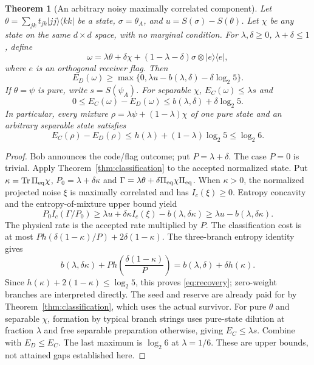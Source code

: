 \documentclass[11pt]{article}
\newtheorem{theorem}{Theorem}
\newcommand{\Tr}{\operatorname{Tr}}
\begin{document}
\begin{theorem}[An arbitrary noisy maximally correlated component]\label{thm:recovery}
Let $\theta=\sum_{jk}t_{jk}|jj\rangle\langle kk|$ be a state,
$\sigma=\theta_A$, and $u=S(\sigma)-S(\theta)$. Let $\chi$ be any
state on the same $d\times d$ space, with no marginal condition.
For $\lambda,\delta\ge0$, $\lambda+\delta\le1$, define
\[
 \omega=\lambda\theta+\delta\chi+
   (1-\lambda-\delta)\sigma\otimes|e\rangle\langle e|,
\]
where $e$ is an orthogonal receiver flag. Then
\begin{equation}\label{eq:recovery}
 E_D(\omega)\ge\max\{0,\lambda u-b(\lambda,\delta)-\delta\log_2 5\}.
\end{equation}
If $\theta=\psi$ is pure, write $s=S(\psi_A)$. For separable $\chi$,
$E_C(\omega)\le\lambda s$ and
\begin{equation}\label{eq:irreversible}
 0\le E_C(\omega)-E_D(\omega)\le b(\lambda,\delta)+\delta\log_2 5.
\end{equation}
In particular, every mixture $\rho=\lambda\psi+(1-\lambda)\chi$ of
one pure state and an arbitrary separable state satisfies
\begin{equation}\label{eq:log6}
 E_C(\rho)-E_D(\rho)\le h(\lambda)+(1-\lambda)\log_2 5\le\log_2 6.
\end{equation}
\end{theorem}
\begin{proof}
Bob announces the code/flag outcome; put $P=\lambda+\delta$.
The case $P=0$ is trivial. Apply Theorem~\ref{thm:classification}
to the accepted normalized state. Put
$\kappa=\Tr\Pi_{\rm eq}\chi$, $P_0=\lambda+\delta\kappa$ and
$\Gamma=\lambda\theta+\delta\Pi_{\rm eq}\chi\Pi_{\rm eq}$.
When $\kappa>0$, the normalized projected noise $\xi$ is maximally
correlated and has $I_c(\xi)\ge0$. Entropy concavity and the
entropy-of-mixture upper bound yield
\[
 P_0 I_c(\Gamma/P_0)
 \ge\lambda u+\delta\kappa I_c(\xi)-b(\lambda,\delta\kappa)
 \ge\lambda u-b(\lambda,\delta\kappa).
\]
The physical rate is the accepted rate multiplied by $P$.
The classification cost is at most
$P h(\delta(1-\kappa)/P)+2\delta(1-\kappa)$.
The three-branch entropy identity gives
\[
 b(\lambda,\delta\kappa)+P h\!\left(\frac{\delta(1-\kappa)}P\right)
 =b(\lambda,\delta)+\delta h(\kappa).
\]
Since $h(\kappa)+2(1-\kappa)\le\log_2 5$, this proves
\eqref{eq:recovery}; zero-weight branches are interpreted directly.
The seed and reserve are already paid for by
Theorem~\ref{thm:classification}, which uses the actual survivor.
For pure $\theta$ and separable $\chi$, formation by typical branch
strings uses pure-state dilution \cite{bbps} at fraction $\lambda$
and free separable preparation otherwise, giving $E_C\le\lambda s$.
Combine with $E_D\le E_C$. The last maximum is $\log_2 6$ at
$\lambda=1/6$. These are upper bounds, not attained gaps established here.
\end{proof}
\end{document}
